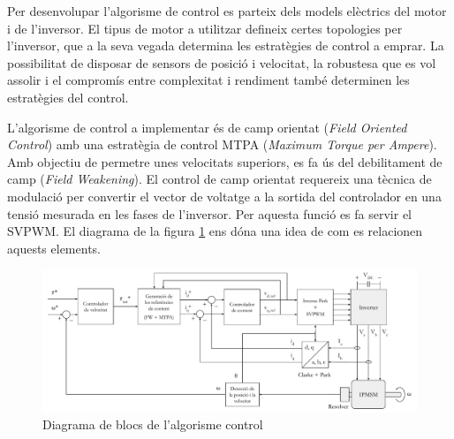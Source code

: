 Per desenvolupar l'algorisme de control es parteix dels models elèctrics del
motor i de l'inversor. El tipus de motor a utilitzar defineix certes topologies
per l'inversor, que a la seva vegada determina les estratègies de control a
emprar. La possibilitat de disposar de sensors de posició i velocitat, la
robustesa que es vol assolir i el compromís entre complexitat i rendiment també
determinen les estratègies del control.

L'algorisme de control a implementar és de camp orientat (\emph{Field Oriented
Control}) amb una estratègia de control MTPA (\emph{Maximum Torque per
Ampere}). Amb objectiu de permetre unes velocitats superiors, es fa ús del
debilitament de camp (\emph{Field Weakening}). El control de camp orientat
requereix una tècnica de modulació per convertir el vector de voltatge a la
sortida del controlador en una tensió mesurada en les fases de l'inversor. Per
aquesta funció es fa servir el \acs{SVPWM}. El diagrama de la figura
\ref{simple} ens dóna una idea de com es relacionen aquests elements.

\begin{figure}[!htb]
    \centering
    \captionsetup{justification=centering, margin=1cm}
    \includegraphics[width=14cm]
        { img/3_control_motor/simple.pdf }
    \caption[Diagrama de blocs del control]
        { Diagrama de blocs de l'algorisme control }
    \label{simple}
\end{figure}

